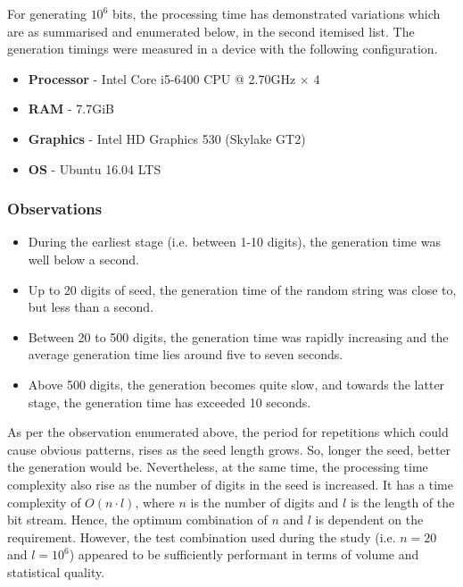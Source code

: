 For generating $10^6$ bits, the processing time has demonstrated variations which are as summarised and enumerated below, in the second itemised list. The generation timings were measured in a device with the following configuration.

\begin{itemize}
    \item \textbf{Processor} - Intel Core i5-6400 CPU @ 2.70GHz $\times$ 4
    \item \textbf{RAM} - 7.7GiB
    \item \textbf{Graphics} - Intel HD Graphics 530 (Skylake GT2)
    \item \textbf{OS} - Ubuntu 16.04 LTS
\end{itemize}

\subsubsection{Observations}
\begin{itemize}
    \item During the earliest stage (i.e. between 1-10 digits), the generation time was well below a second.
    
    \item Up to 20 digits of seed, the generation time of the random string was close to, but less than a second.
    
    \item Between 20 to 500 digits, the generation time was rapidly increasing and the average generation time lies around five to seven seconds.
    
    \item Above 500 digits, the generation becomes quite slow, and towards the latter stage, the generation time has exceeded 10 seconds.
\end{itemize}

As per the observation enumerated above, the period for repetitions which could cause obvious patterns, rises as the seed length grows. So, longer the seed, better the generation would be. Nevertheless, at the same time, the processing time complexity also rise as the number of digits in the seed is increased. It has a time complexity of $O(n \cdot l)$, where $n$ is the number of digits and $l$ is the length of the bit stream. Hence, the optimum combination of $n$ and $l$ is dependent on the requirement. However, the test combination used during the study (i.e. $n=20$ and $l=10^6$) appeared to be sufficiently performant in terms of volume and statistical quality.

